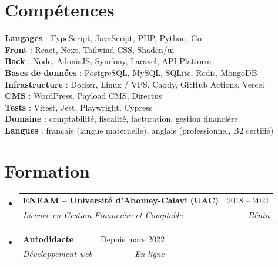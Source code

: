 \documentclass[a4paper,11pt]{article}
\makeatletter
\newlength{\entrygap}
\newlength{\headgap}
\newcommand{\resumeSubheading}[4]{
    \vspace{\entrygap}\item
    \begin{tabular*}{0.97\textwidth}[t]{l@{\extracolsep{\fill}}r}
        \textbf{#1} & #2 \\
        \textit{\small#3} & \textit{\small #4} \\
    \end{tabular*}\vspace{\headgap}
}
\newcommand{\resumeSubHeadingListStart}{\begin{itemize}[leftmargin=0.15in, label={}]}
\newcommand{\resumeSubHeadingListEnd}{\end{itemize}}
\makeatother
\begin{document}
\section{Compétences}
\begin{itemize}[leftmargin=0.15in, label={}]
    \small{\item{
        \textbf{Langages}{ : TypeScript, JavaScript, PHP, Python, Go} \\
        \textbf{Front}{ : React, Next, Tailwind CSS, Shadcn/ui} \\
        \textbf{Back}{ : Node, AdonisJS, Symfony, Laravel, API Platform} \\
        \textbf{Bases de données}{ : PostgreSQL, MySQL, SQLite, Redis, MongoDB} \\
        \textbf{Infrastructure}{ : Docker, Linux / VPS, Caddy, GitHub Actions, Vercel} \\
        \textbf{CMS}{ : WordPress, Payload CMS, Directus} \\
        \textbf{Tests}{ : Vitest, Jest, Playwright, Cypress} \\
        \textbf{Domaine}{ : comptabilité, fiscalité, facturation, gestion financière} \\
        \textbf{Langues}{ : français (langue maternelle), anglais (professionnel, B2 certifié)}
    }}
\end{itemize}

\section{Formation}
\resumeSubHeadingListStart
    \resumeSubheading
        {ENEAM -- Université d'Abomey-Calavi (UAC)}{2018 -- 2021}
        {Licence en Gestion Financière et Comptable}{Bénin}
    \resumeSubheading
        {Autodidacte}{Depuis mars 2022}
        {Développement web}{En ligne}
\resumeSubHeadingListEnd

\end{document}
